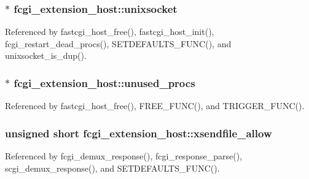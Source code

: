 \hypertarget{structfcgi__extension__host_a3a3daea2e667a74a3d8eca2216603c47}{
\subsubsection[{unixsocket}]{$\ast$ fcgi\-\_\-extension\-\_\-host\-::unixsocket}}\label{structfcgi__extension__host_a3a3daea2e667a74a3d8eca2216603c47}


Referenced by fastcgi\-\_\-host\-\_\-free(), fastcgi\-\_\-host\-\_\-init(), fcgi\-\_\-restart\-\_\-dead\-\_\-procs(), S\-E\-T\-D\-E\-F\-A\-U\-L\-T\-S\-\_\-\-F\-U\-N\-C(), and unixsocket\-\_\-is\-\_\-dup().

\hypertarget{structfcgi__extension__host_abc9cc43adc180cf06b771c8a5cff0f61}{
\subsubsection[{unused\-\_\-procs}]{$\ast$ fcgi\-\_\-extension\-\_\-host\-::unused\-\_\-procs}}\label{structfcgi__extension__host_abc9cc43adc180cf06b771c8a5cff0f61}


Referenced by fastcgi\-\_\-host\-\_\-free(), F\-R\-E\-E\-\_\-\-F\-U\-N\-C(), and T\-R\-I\-G\-G\-E\-R\-\_\-\-F\-U\-N\-C().

\hypertarget{structfcgi__extension__host_a8c978afa31288861b2b5b9917aed34a6}{
\subsubsection[{xsendfile\-\_\-allow}]{\setlength{\rightskip}{0pt plus 5cm}unsigned short fcgi\-\_\-extension\-\_\-host\-::xsendfile\-\_\-allow}}\label{structfcgi__extension__host_a8c978afa31288861b2b5b9917aed34a6}


Referenced by fcgi\-\_\-demux\-\_\-response(), fcgi\-\_\-response\-\_\-parse(), scgi\-\_\-demux\-\_\-response(), and S\-E\-T\-D\-E\-F\-A\-U\-L\-T\-S\-\_\-\-F\-U\-N\-C().

